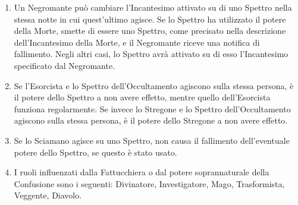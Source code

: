 \documentclass[a4paper,10pt]{article}
\begin{document}
\begin{enumerate}
	\item Un Negromante può cambiare l'Incantesimo attivato su di uno Spettro nella stessa notte in cui quest'ultimo agisce. Se lo Spettro ha utilizzato il potere della Morte, smette di essere uno Spettro, come precisato nella descrizione dell'Incantesimo della Morte, e il Negromante riceve una notifica di fallimento. Negli altri casi, lo Spettro avrà attivato su di esso l'Incantesimo specificato dal Negromante.
	
	\item Se l'Esorcista e lo Spettro dell'Occultamento agiscono sulla stessa persona, è il potere dello Spettro a non avere effetto, mentre quello dell'Esorcista funziona regolarmente. Se invece lo Stregone e lo Spettro dell'Occultamento agiscono sulla stessa persona, è il potere dello Stregone a non avere effetto.
	
	\item Se lo Sciamano agisce su uno Spettro, non causa il fallimento dell'eventuale potere dello Spettro, se questo è stato usato.
	
	
	

	
	\item I ruoli influenzati dalla Fattucchiera o dal potere soprannaturale della Confusione sono i seguenti: Divinatore, Investigatore, Mago, Trasformista, Veggente, Diavolo.
	

\end{enumerate}
\end{document}
